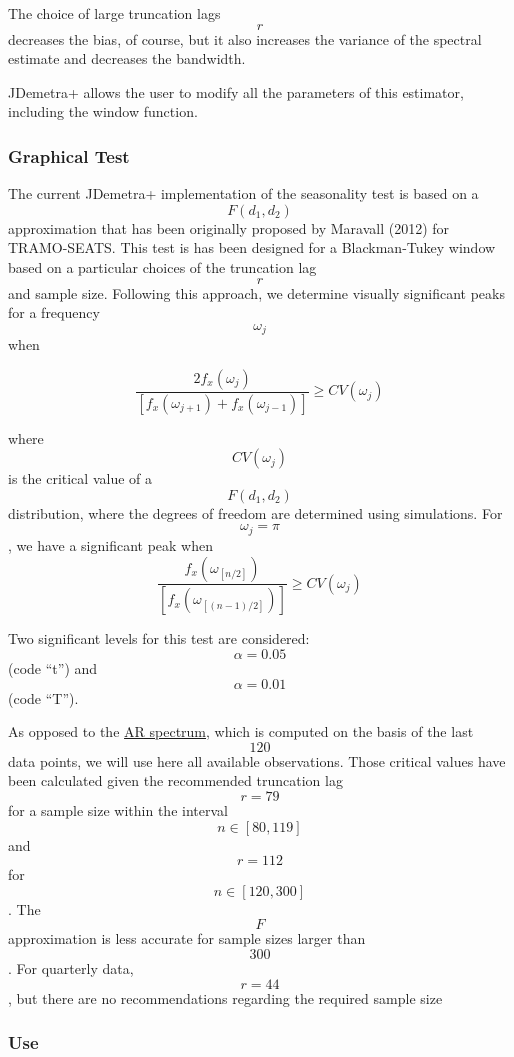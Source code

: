 \documentclass[
]{book}
\begin{document}
The choice of large truncation lags \[r\] decreases the bias, of course, but it also increases the variance of the spectral estimate and decreases the bandwidth.

JDemetra+ allows the user to modify all the parameters of this estimator, including the window function.

\hypertarget{graphical-test}{%
\subsubsection{Graphical Test}\label{graphical-test}}

The current JDemetra+ implementation of the seasonality test is based on a \[F(d_{1},d_{2})\] approximation that has been originally proposed by Maravall (2012) for
TRAMO-SEATS. This test is has been designed for a Blackman-Tukey window based on a particular choices of the truncation lag \[r\] and sample size. Following
this approach, we determine visually significant peaks for a frequency \[\omega_{j}\] when

\[ 
\frac{2 f_{x}(\omega_{j})}{\left[ f_{x}(\omega_{j+1})+ f_{x}(\omega_{j-1}) \right]} \ge CV(\omega_{j}) 
\]

where \[ CV(\omega_{j})\] is the critical value of a \[F(d_{1},d_{2})\] distribution, where the degrees of freedom are determined using simulations. For
\[\omega_{j}= \pi\], we have a significant peak when \[\frac{f_{x}(\omega_{[n/2]})}{\left[ f_{x}(\omega_{[(n-1)/2]})\right]} \ge CV(\omega_{j}) \]

Two significant levels for this test are considered: \[\alpha=0.05\] (code ``t'') and \[\alpha=0.01\] (code ``T'').

As opposed to the \href{\%7B\%7B\%20site.baseurl\%20\%7D\%7D/pages/theory/Tests_ARspectrum.html}{AR spectrum}, which is computed on the basis of the
last \[120\] data points, we will use here all available
observations. Those critical values have been calculated given the recommended truncation lag \[r=79\] for a sample size within the interval \[n \in [80,119]\]
and \[r=112\] for \[n \in [120,300]\] . The \[F\] approximation is less accurate for sample sizes larger than \[300\]. For quarterly data, \[r=44 \], but there
are no recommendations regarding the required sample size

\hypertarget{use-2}{%
\subsubsection{Use}\label{use-2}}
\end{document}
